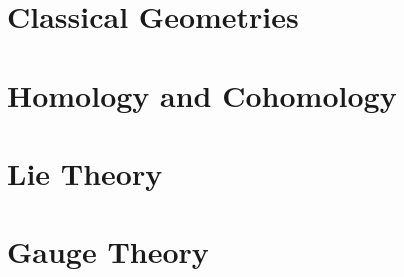 \documentclass[english,a5paper]{book}%
\begin{document}
\clearpage
\part{Classical Geometries \texorpdfstring{\ucmark}{}}\label{Part Classical Geom}



\clearpage
\part{Homology and Cohomology}\label{Part Homology}



\clearpage
\part{Lie Theory \texorpdfstring{\ucmark}{}}\label{part Lie Theory}




\clearpage
\part{Gauge Theory \texorpdfstring{\ucmark}{}}\label{Part III}




\clearpage
{}
% 


\setlength\bibhang{0pt} %
\setlength\bibitemsep{2pt} %
\printbibliography[heading=bibintoc]

\printindex
\end{document}
